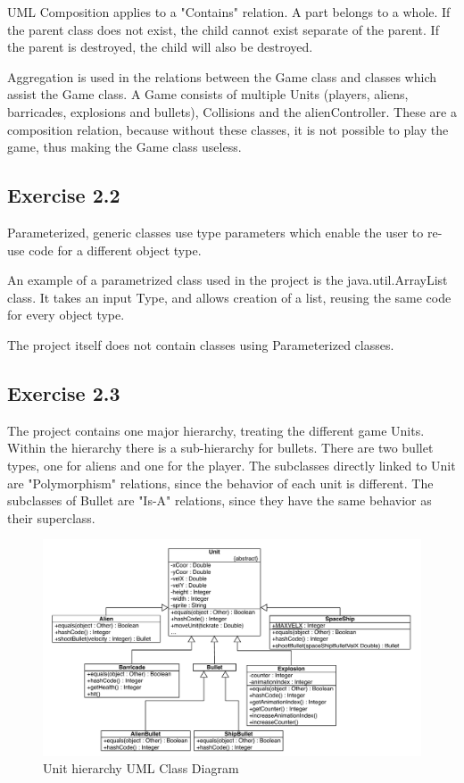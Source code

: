 \documentclass[10pt]{article}
\begin{document}
UML Composition applies to a "Contains" relation.
A part belongs to a whole. If the parent class does not exist, the child cannot exist separate of the parent. 
If the parent is destroyed, the child will also be destroyed.

Aggregation is used in the relations between the Game class and classes which assist the Game class.
A Game consists of multiple Units (players, aliens, barricades, explosions and bullets), Collisions and the alienController. These are a composition relation, because without these classes, it is not possible to play the game, thus making the Game class useless.

\subsection{Exercise  2.2}
Parameterized, generic classes use type parameters which enable the user to re-use code for a different object type. 

An example of a parametrized class used in the project is the java.util.ArrayList class.
It takes an input Type, and allows creation of a list, reusing the same code for every object type.

The project itself does not contain classes using Parameterized classes.
\pagebreak
\subsection{Exercise  2.3}
The project contains one major hierarchy, treating the different game Units. 
Within the hierarchy there is a sub-hierarchy for bullets. There are two bullet types, one for aliens and one for the player.
The subclasses directly linked to Unit are "Polymorphism" relations, since the behavior of each unit is different.
The subclasses of Bullet are "Is-A" relations, since they have the same behavior as their superclass.

\begin{figure}[ht!]
\includegraphics[width=1.1\textwidth]{SI-UMLhierarchies.pdf}
\caption{Unit hierarchy UML Class Diagram}
\end{figure}
\end{document}
